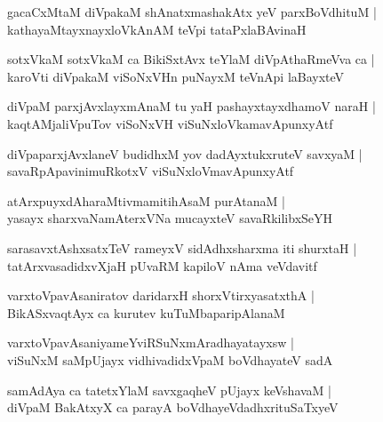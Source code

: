 \documentclass[twoside,12pt,openright]{book}
\newcounter{shloka}[chapter]
\begin{document}
\begin{shloka}%
gacaCxMtaM diVpakaM shAnatxmashakAtx yeV parxBoVdhituM |\\
kathayaMtayxnayxloVkAnAM teVpi tataPxlaBAvinaH 
\end{shloka}

\begin{shloka}%
sotxVkaM sotxVkaM ca BikiSxtAvx teYlaM diVpAthaRmeVva ca |\\
karoVti diVpakaM viSoNxVHn puNayxM teVnApi laBayxteV 
\end{shloka}

\begin{shloka}%
diVpaM parxjAvxlayxmAnaM tu yaH  pashayxtayxdhamoV naraH |\\
kaqtAMjaliVpuTov viSoNxVH viSuNxloVkamavApunxyAtf
\end{shloka}

\begin{shloka}%
diVpaparxjAvxlaneV budidhxM yov dadAyxtukxruteV savxyaM |\\
savaRpApavinimuRkotxV viSuNxloVmavApunxyAtf
\end{shloka}

\begin{shloka}%
atArxpuyxdAharaMtivmamitihAsaM purAtanaM |\\
yasayx sharxvaNamAterxVNa mucayxteV savaRkilibxSeYH 
\end{shloka}

\begin{shloka}%
sarasavxtAshxsatxTeV rameyxV sidAdhxsharxma iti shurxtaH |\\
tatArxvasadidxvXjaH pUvaRM kapiloV nAma veVdavitf
\end{shloka}

\begin{shloka}%
varxtoVpavAsaniratov daridarxH shorxVtirxyasatxthA |\\
BikASxvaqtAyx ca kurutev kuTuMbaparipAlanaM 
\end{shloka}

\begin{shloka}%
varxtoVpavAsaniyameYviRSuNxmAradhayatayxsw |\\
viSuNxM saMpUjayx vidhivadidxVpaM boVdhayateV sadA 
\end{shloka}

\begin{shloka}%
samAdAya ca tatetxYlaM savxgaqheV pUjayx keVshavaM |\\
diVpaM BakAtxyX ca parayA boVdhayeVdadhxrituSaTxyeV
\end{shloka}
\end{document}
